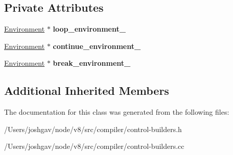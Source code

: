 \subsection*{Private Attributes}
\begin{DoxyCompactItemize}
\item 
\hyperlink{classv8_1_1internal_1_1compiler_1_1_ast_graph_builder_1_1_environment}{Environment} $\ast$ {\bfseries loop\+\_\+environment\+\_\+}\hypertarget{classv8_1_1internal_1_1compiler_1_1_loop_builder_a23fc8f80f8d223e6494ca99ade4c3866}{}\label{classv8_1_1internal_1_1compiler_1_1_loop_builder_a23fc8f80f8d223e6494ca99ade4c3866}

\item 
\hyperlink{classv8_1_1internal_1_1compiler_1_1_ast_graph_builder_1_1_environment}{Environment} $\ast$ {\bfseries continue\+\_\+environment\+\_\+}\hypertarget{classv8_1_1internal_1_1compiler_1_1_loop_builder_ab2345359e98e76dff5c12504ab05fab2}{}\label{classv8_1_1internal_1_1compiler_1_1_loop_builder_ab2345359e98e76dff5c12504ab05fab2}

\item 
\hyperlink{classv8_1_1internal_1_1compiler_1_1_ast_graph_builder_1_1_environment}{Environment} $\ast$ {\bfseries break\+\_\+environment\+\_\+}\hypertarget{classv8_1_1internal_1_1compiler_1_1_loop_builder_a8dd4e0362e09a660c9e88728a1011aba}{}\label{classv8_1_1internal_1_1compiler_1_1_loop_builder_a8dd4e0362e09a660c9e88728a1011aba}

\end{DoxyCompactItemize}
\subsection*{Additional Inherited Members}


The documentation for this class was generated from the following files\+:\begin{DoxyCompactItemize}
\item 
/\+Users/joshgav/node/v8/src/compiler/control-\/builders.\+h\item 
/\+Users/joshgav/node/v8/src/compiler/control-\/builders.\+cc\end{DoxyCompactItemize}
